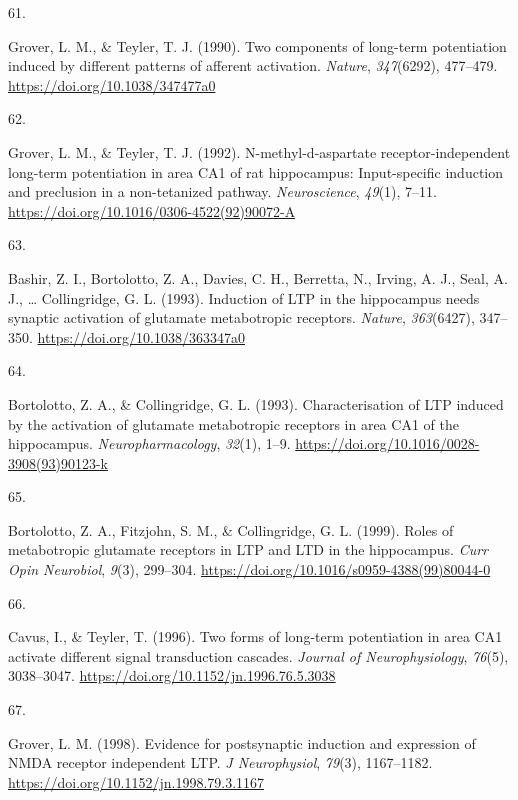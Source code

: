 \documentclass[
  11pt,
  letterpaper,
]{scrreprt}
\newlength{\cslhangindent}
\newlength{\csllabelwidth}
\newenvironment{CSLReferences}[2] %
 {\begin{list}{}{%
  \setlength{\itemindent}{0pt}
  \setlength{\leftmargin}{0pt}
  \setlength{\parsep}{0pt}
  \ifodd #1
   \setlength{\leftmargin}{\cslhangindent}
   \setlength{\itemindent}{-1\cslhangindent}
  \fi
  \setlength{\itemsep}{#2\baselineskip}}}
 {\end{list}}
\newcommand{\CSLLeftMargin}[1]{\parbox[t]{\csllabelwidth}{\strut#1\strut}}
\newcommand{\CSLRightInline}[1]{\parbox[t]{\linewidth - \csllabelwidth}{\strut#1\strut}}
\begin{document}
\begin{CSLReferences}{0}{0}
\CSLLeftMargin{61. }%
\CSLRightInline{Grover, L. M., \& Teyler, T. J. (1990). Two components
of long-term potentiation induced by different patterns of afferent
activation. \emph{Nature}, \emph{347}(6292), 477--479.
\url{https://doi.org/10.1038/347477a0}}

\CSLLeftMargin{62. }%
\CSLRightInline{Grover, L. M., \& Teyler, T. J. (1992).
N-methyl-d-aspartate receptor-independent long-term potentiation in area
{CA1} of rat hippocampus: {Input-specific} induction and preclusion in a
non-tetanized pathway. \emph{Neuroscience}, \emph{49}(1), 7--11.
\url{https://doi.org/10.1016/0306-4522(92)90072-A}}

\CSLLeftMargin{63. }%
\CSLRightInline{Bashir, Z. I., Bortolotto, Z. A., Davies, C. H.,
Berretta, N., Irving, A. J., Seal, A. J., \ldots{} Collingridge, G. L.
(1993). Induction of {LTP} in the hippocampus needs synaptic activation
of glutamate metabotropic receptors. \emph{Nature}, \emph{363}(6427),
347--350. \url{https://doi.org/10.1038/363347a0}}

\CSLLeftMargin{64. }%
\CSLRightInline{Bortolotto, Z. A., \& Collingridge, G. L. (1993).
Characterisation of {LTP} induced by the activation of glutamate
metabotropic receptors in area {CA1} of the hippocampus.
\emph{Neuropharmacology}, \emph{32}(1), 1--9.
\url{https://doi.org/10.1016/0028-3908(93)90123-k}}

\CSLLeftMargin{65. }%
\CSLRightInline{Bortolotto, Z. A., Fitzjohn, S. M., \& Collingridge, G.
L. (1999). Roles of metabotropic glutamate receptors in {LTP} and {LTD}
in the hippocampus. \emph{Curr Opin Neurobiol}, \emph{9}(3), 299--304.
\url{https://doi.org/10.1016/s0959-4388(99)80044-0}}

\CSLLeftMargin{66. }%
\CSLRightInline{Cavus, I., \& Teyler, T. (1996). Two forms of long-term
potentiation in area {CA1} activate different signal transduction
cascades. \emph{Journal of Neurophysiology}, \emph{76}(5), 3038--3047.
\url{https://doi.org/10.1152/jn.1996.76.5.3038}}

\CSLLeftMargin{67. }%
\CSLRightInline{Grover, L. M. (1998). Evidence for postsynaptic
induction and expression of {NMDA} receptor independent {LTP}. \emph{J
Neurophysiol}, \emph{79}(3), 1167--1182.
\url{https://doi.org/10.1152/jn.1998.79.3.1167}}


\end{CSLReferences}
\end{document}
